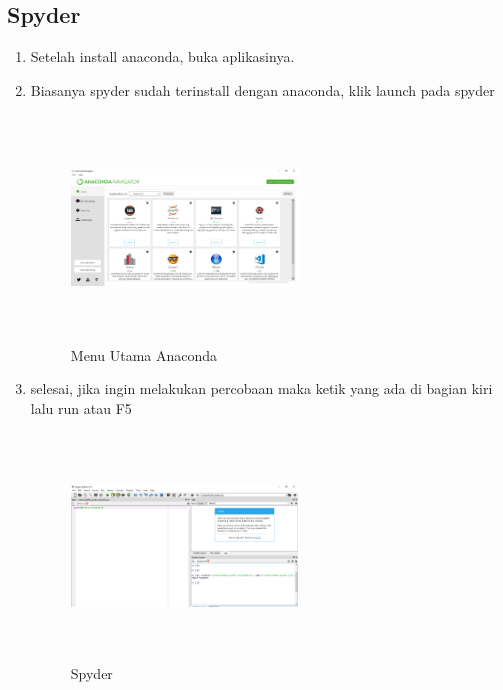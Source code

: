 \subsection{Spyder}
\begin{enumerate}
\item Setelah install anaconda, buka aplikasinya.
\item Biasanya spyder sudah terinstall dengan anaconda, klik launch pada spyder
\begin{figure}[H]
\centering
\includegraphics[width=6cm,height=6cm]{figures/gambar9.png}
\caption{Menu Utama Anaconda}
\label{Spyder}
\end{figure}
\item selesai, jika ingin melakukan percobaan maka ketik yang ada di bagian kiri lalu run atau F5
\begin{figure}[H]
\centering
\includegraphics[width=6cm,height=6cm]{figures/10.png}
\caption{Spyder}
\label{akhir}
\end{figure}




\end{enumerate}

